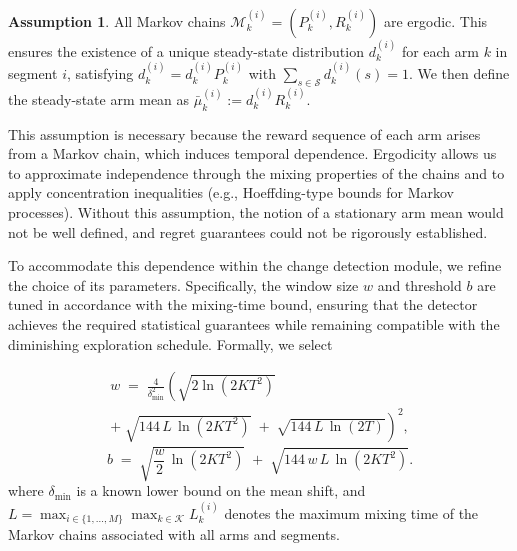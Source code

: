 \documentclass[twoside]{article}
\theoremstyle{plain}
\theoremstyle{definition}
\newtheorem{assumption}[theorem]{Assumption}
\theoremstyle{remark}
\begin{document}
\begin{assumption}\label{assump:ergodic}
All Markov chains $\mathcal{M}_k^{(i)} = (P_k^{(i)},R_k^{(i)})$ are ergodic. 
This ensures the existence of a unique steady-state distribution $d_k^{(i)}$ for 
each arm $k$ in segment $i$, satisfying 
$d_k^{(i)} = d_k^{(i)} P_k^{(i)}$ with $\sum_{s \in \mathcal{S}} d_k^{(i)}(s) = 1$. 
We then define the steady-state arm mean as 
$\bar{\mu}_k^{(i)} := d_k^{(i)} R_k^{(i)}$.
\end{assumption}
\vspace{-5pt}
This assumption is necessary because the reward sequence of each arm arises from a 
Markov chain, which induces temporal dependence. 
Ergodicity allows us to approximate independence through the mixing properties 
of the chains and to apply concentration inequalities (e.g., Hoeffding-type bounds 
for Markov processes). 
Without this assumption, the notion of a stationary arm mean would not be 
well defined, and regret guarantees could not be rigorously established.

To accommodate this dependence within the change detection module, we refine the choice of its parameters. Specifically, the window size $w$ and threshold $b$ are tuned in accordance with the mixing-time bound, ensuring that the detector achieves the required statistical guarantees while remaining compatible with the diminishing exploration schedule.
Formally, we select

\begin{multline}\label{eqn:w_gen}
w \;=\; \frac{4}{\delta_{\min}^{2}}\!\left(
  \sqrt{2\ln(2KT^{2})}
  \;\right.\\ +\left.\; \sqrt{144\,L\,\ln(2KT^{2})}
  \;+\; \sqrt{144\,L\,\ln(2T)}
\right)^{2}, 
\end{multline}
\vspace{-0.5cm}
\begin{equation}\label{eqn:b_gen}
b \;=\; \sqrt{\frac{w}{2}\,\ln(2KT^{2})}
\;+\; \sqrt{144\,w\,L\,\ln(2KT^{2})}.
\end{equation}
where $\delta_{\min}$ is a known lower bound on the mean shift, and $L = \max_{i \in \{1,\dots,M\}} \max_{k \in \mathcal{K}} L_k^{(i)}$ 
denotes the maximum mixing time of the Markov chains associated with all arms and segments.
\end{document}

